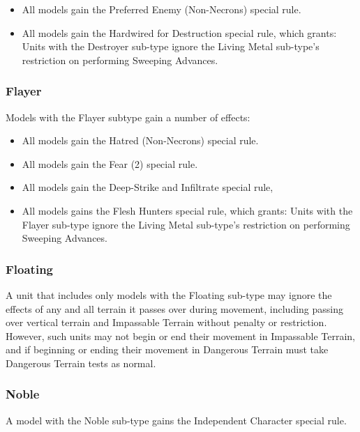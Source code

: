 \begin{itemize}
	\item All models gain the Preferred Enemy (Non-Necrons) special rule. \\
	\item All models gain the Hardwired for Destruction special rule, which grants: Units with the Destroyer sub-type ignore the Living Metal sub-type's restriction on performing Sweeping Advances. \\
\end{itemize}

\subsubsection{Flayer} \label{Flayer}

Models with the Flayer subtype gain a number of effects:

\begin{itemize}
	\item All models gain the Hatred (Non-Necrons) special rule. \\
	\item All models gain the Fear (2) special rule. \\
	\item All models gain the Deep-Strike and Infiltrate special rule, \\
	\item All models gains the Flesh Hunters special rule, which grants: Units with the Flayer sub-type ignore the Living Metal sub-type's restriction on performing Sweeping Advances. \\
\end{itemize}

\subsubsection{Floating} \label{Floating}

A unit that includes only models with the Floating sub-type may ignore the effects of any and all terrain it passes over during movement, including passing over vertical terrain and Impassable Terrain without penalty or restriction. However, such units may not begin or end their movement in Impassable Terrain, and if beginning or ending their movement in Dangerous Terrain must take Dangerous Terrain tests as normal.

\subsubsection{Noble} \label{Noble}

A model with the Noble sub-type gains the Independent Character special rule. \\
